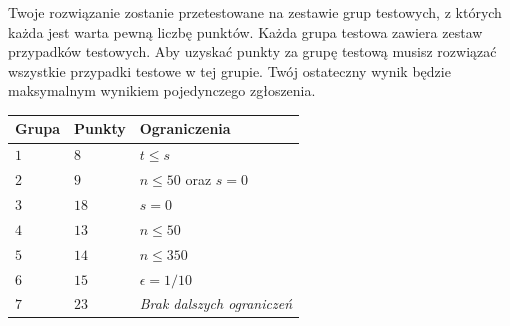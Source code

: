 Twoje rozwiązanie zostanie przetestowane na zestawie grup testowych, z których każda jest warta pewną liczbę punktów.
Każda grupa testowa zawiera zestaw przypadków testowych.
Aby uzyskać punkty za grupę testową musisz rozwiązać wszystkie przypadki testowe w tej grupie.
Twój ostateczny wynik będzie maksymalnym wynikiem pojedynczego zgłoszenia.

\medskip
\noindent
\begin{tabular}{lll}
 Grupa & Punkty & Ograniczenia\\\hline
  $1$ & $8$ &  $t\leq s$\\
  $2$ & $9$ & $n\le 50$ oraz $s=0$\\
  $3$ & $18$ & $s=0$\\
  $4$ & $13$ & $n\leq 50$\\
  $5$ & $14$ & $n\leq 350$\\
  $6$ & $15$ & $\epsilon = 1/10$\\
  $7$ & $23$ & \emph{Brak dalszych ograniczeń}\\
\end{tabular}
